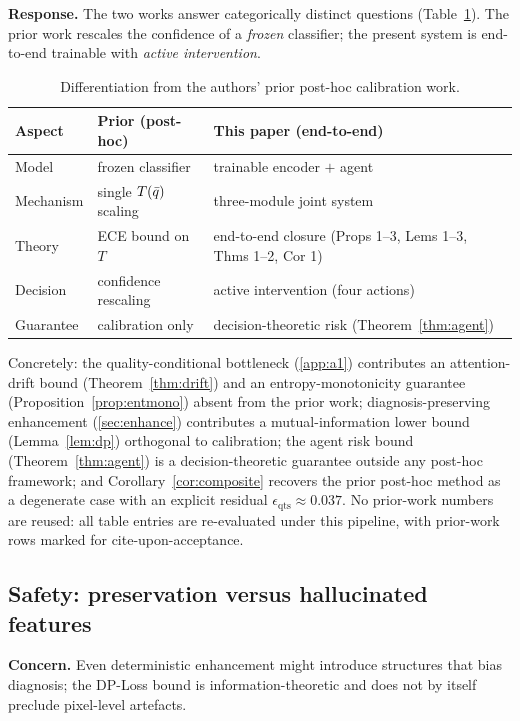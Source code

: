 \textbf{Response.} The two works answer categorically distinct questions
(Table~\ref{tab:a21-diff}). The prior work rescales the confidence of a \emph{frozen} classifier; the
present system is end-to-end trainable with \emph{active intervention}.

\begin{table}[t]
\centering
\caption{Differentiation from the authors' prior post-hoc calibration work.}
\label{tab:a21-diff}
\begin{tabular}{lll}
\toprule
Aspect & Prior (post-hoc) & This paper (end-to-end) \\
\midrule
Model      & frozen classifier        & trainable encoder $+$ agent \\
Mechanism  & single $T(\bar{q})$ scaling & three-module joint system \\
Theory     & ECE bound on $T$         & end-to-end closure (Props 1--3, Lems 1--3, Thms 1--2, Cor 1) \\
Decision   & confidence rescaling     & active intervention (four actions) \\
Guarantee  & calibration only         & decision-theoretic risk (Theorem~\ref{thm:agent}) \\
\bottomrule
\end{tabular}
\end{table}

Concretely: the quality-conditional bottleneck (\cref{app:a1}) contributes an attention-drift bound
(Theorem~\ref{thm:drift}) and an entropy-monotonicity guarantee (Proposition~\ref{prop:entmono})
absent from the prior work; diagnosis-preserving enhancement (\cref{sec:enhance}) contributes a
mutual-information lower bound (Lemma~\ref{lem:dp}) orthogonal to calibration; the agent risk bound
(Theorem~\ref{thm:agent}) is a decision-theoretic guarantee outside any post-hoc framework; and
Corollary~\ref{cor:composite} recovers the prior post-hoc method as a degenerate case with an
explicit residual $\epsilon_{\mathrm{qts}}\approx 0.037$. No prior-work numbers are reused: all table
entries are re-evaluated under this pipeline, with prior-work rows marked for cite-upon-acceptance.

\subsection{Safety: preservation versus hallucinated features}\label{app:a21-safety}
\textbf{Concern.} Even deterministic enhancement might introduce structures that bias diagnosis; the
DP-Loss bound is information-theoretic and does not by itself preclude pixel-level artefacts.

